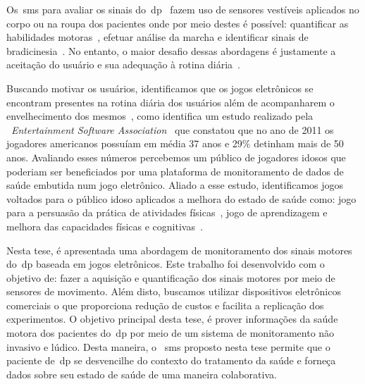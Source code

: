 

Os~\ac{sms} para avaliar os sinais do~\ac{dp}~\cite{mazilu2015} fazem uso de sensores vestíveis aplicados no corpo ou na roupa dos pacientes onde por meio destes é possível: quantificar as habilidades motoras~\cite{manumeterjbhi2014,patel_monitoring_2009}, efetuar análise da marcha \cite{robotgait2014} e identificar sinais de bradicinesia~\cite{ambulatoryparkinson2010}. No entanto, o maior desafio dessas abordagens é justamente a aceitação do usuário e sua adequação à rotina diária~\cite{alemdar2015}. %

Buscando motivar os usuários, identificamos que os jogos eletrônicos se encontram presentes na rotina diária dos usuários além de acompanharem o envelhecimento dos mesmos~\cite{moore2011basics}, como identifica um estudo realizado pela ~\textit{Entertainment Software Association}~\cite{esa2011} que constatou que no ano de 2011 os jogadores americanos possuíam em média 37 anos e 29$\%$ detinham mais de 50 anos. Avaliando esses números percebemos um público de jogadores idosos que poderiam ser beneficiados por uma plataforma de monitoramento de dados de saúde embutida num jogo eletrônico. Aliado a esse estudo, identificamos jogos voltados para o público idoso aplicados a melhora do estado de saúde como: jogo para a persuasão da prática de atividades físicas~\cite{brox11}, jogo de aprendizagem e melhora das capacidades físicas e cognitivas~\cite{arntzen2011}. 

Nesta tese, é apresentada uma abordagem de monitoramento dos sinais motores do~\ac{dp} baseada em jogos eletrônicos. Este trabalho foi desenvolvido com o objetivo de: fazer a aquisição e quantificação dos sinais motores por meio de sensores de movimento. Além disto, buscamos utilizar dispositivos eletrônicos comerciais o que proporciona redução de custos e facilita a replicação dos experimentos. O objetivo principal desta tese, é prover informações da saúde motora dos pacientes do~\ac{dp} por meio de um sistema de monitoramento não invasivo e lúdico. Desta maneira, o ~\ac{sms} proposto nesta tese permite que o paciente de~\ac{dp} se desvencilhe do contexto do tratamento da saúde e forneça dados sobre seu estado de saúde de uma maneira colaborativa.

